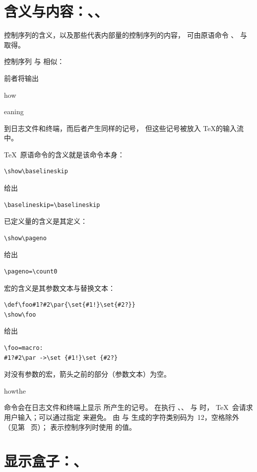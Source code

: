 \documentclass[a4paper]{rapport3}
\makeatletter
\def\alt{}\def\altt{}%
\def\cstoidx#1\par{\index{#1@\cs{#1}}}
\def\csidx#1{\cstoidx #1\par\cs{#1}}
\makeatother
\begin{document}
\section{含义与内容：\protect{}、\protect{}、\protect{}}

控制序列的含义，以及那些代表内部量的控制序列的内容，
可由原语命令 、 与~ 取得。

控制序列  与  相似：
\alt
前者将输出
\cstoidx show\par\cstoidx meaning\par
到日志文件和终端，而后者产生同样的记号，
但这些记号被放入 \TeX 的输入流中。

\TeX\ 原语命令的含义就是该命令本身：
\begin{verbatim}
\show\baselineskip
\end{verbatim}
给出
\begin{verbatim}
\baselineskip=\baselineskip
\end{verbatim}
已定义量的含义是其定义：
\begin{verbatim}
\show\pageno
\end{verbatim}
给出
\begin{verbatim}
\pageno=\count0
\end{verbatim}
宏的含义是其参数文本与替换文本：
\begin{verbatim}
\def\foo#1?#2\par{\set{#1!}\set{#2?}}
\show\foo
\end{verbatim}
给出
\begin{verbatim}
\foo=macro:
#1?#2\par ->\set {#1!}\set {#2?}
\end{verbatim}
对没有参数的宏，箭头之前的部分（参数文本）为空。

\csidx{showthe} 命令会在日志文件和终端上显示  所产生的记号。
在执行 、、 与  时，
\TeX\ 会请求用户输入；可以通过指定  来避免。
由  与  生成的字符类别码为~12，空格除外
（见第~\pageref{cat12} 页）；
表示控制序列时使用  的值。

\section{显示盒子：\protect{}、\protect{}}
\end{document}
